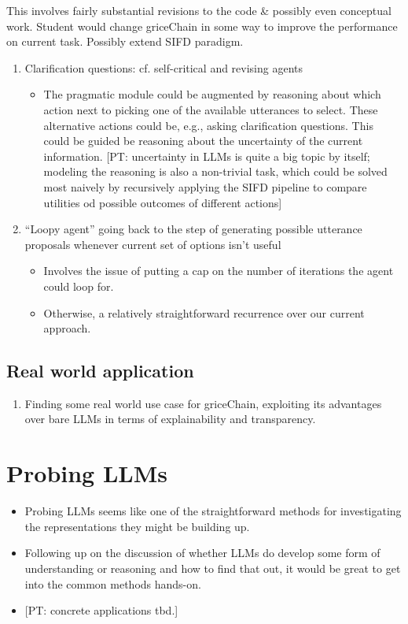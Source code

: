 \documentclass[fleqn,reqno,10pt]{article}
\newcommand{\pt}[1]{\textcolor{CSP-accent-1}{[PT: #1]}}
\begin{document}
This involves fairly substantial revisions to the code \& possibly even conceptual work.  Student would change griceChain in some way to improve the performance on current task. Possibly extend SIFD paradigm.

\begin{enumerate}
  \item Clarification questions: cf. self-critical and revising agents
  \begin{itemize}
    \item The pragmatic module could be augmented by reasoning about which action next to picking one of the available utterances to select. These alternative actions could be, e.g., asking clarification questions. This could be guided be reasoning about the uncertainty of the current information. \pt{uncertainty in LLMs is quite a big topic by itself; modeling the reasoning is also a non-trivial task, which could be solved most naively by recursively applying the SIFD pipeline to compare utilities od possible outcomes of different actions}
  \end{itemize}
  \item ``Loopy agent'' going back to the step of generating possible utterance proposals whenever current set of options isn't useful
  \begin{itemize}
    \item Involves the issue of putting a cap on the number of iterations the agent could loop for.
    \item Otherwise, a relatively straightforward recurrence over our current approach.
  \end{itemize}
\end{enumerate}

\subsection{Real world application}

\begin{enumerate}
  \item Finding some real world use case for griceChain, exploiting its advantages over bare LLMs in terms of explainability and transparency.
\end{enumerate}

\section{Probing LLMs}
\begin{itemize}
  \item Probing LLMs seems like one of the straightforward methods for investigating the representations they might be building up.
  \item Following up on the discussion of whether LLMs do develop some form of understanding or reasoning and how to find that out, it would be great to get into the common methods hands-on.
  \item \pt{concrete applications tbd.}
\end{itemize}

\printbibliography[heading=bibintoc]
\end{document}
